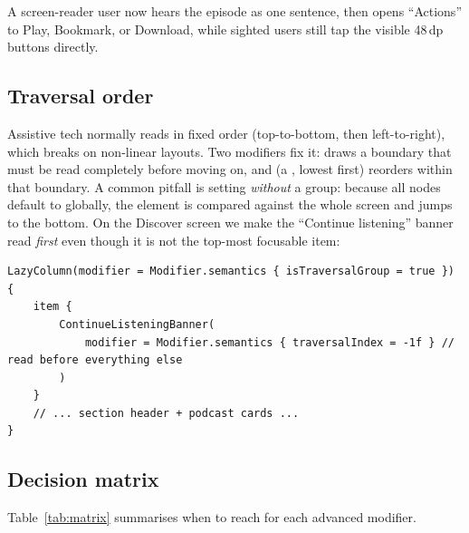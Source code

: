 A screen-reader user now hears the episode as one sentence, then opens ``Actions'' to Play, Bookmark,
or Download, while sighted users still tap the visible 48\,dp buttons directly.

\subsection{Traversal order}

Assistive tech normally reads in fixed order (top-to-bottom, then left-to-right), which breaks on non-linear
layouts. Two modifiers fix it:  draws a boundary that must be read
completely before moving on, and  (a , lowest first) reorders within
that boundary. A common pitfall is setting  \emph{without} a group: because all
nodes default to  globally, the element is compared against the whole screen and jumps to the
bottom. On the Discover screen we make the ``Continue listening'' banner read \emph{first} even though
it is not the top-most focusable item:

\begin{lstlisting}[caption={\texttt{HomeScreen.kt} --- resume banner announced first via a low traversal index.},captionpos=b]
LazyColumn(modifier = Modifier.semantics { isTraversalGroup = true }) {
    item {
        ContinueListeningBanner(
            modifier = Modifier.semantics { traversalIndex = -1f } // read before everything else
        )
    }
    // ... section header + podcast cards ...
}
\end{lstlisting}

\subsection{Decision matrix}

Table~\ref{tab:matrix} summarises when to reach for each advanced modifier.


